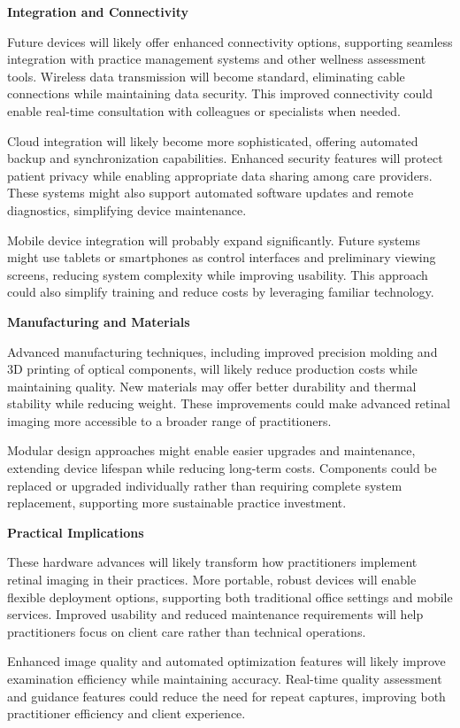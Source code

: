 \documentclass[
  Letterpaper,
]{scrbook}
\begin{document}
\textbf{Integration and Connectivity}

Future devices will likely offer enhanced connectivity options,
supporting seamless integration with practice management systems and
other wellness assessment tools. Wireless data transmission will become
standard, eliminating cable connections while maintaining data security.
This improved connectivity could enable real-time consultation with
colleagues or specialists when needed.

Cloud integration will likely become more sophisticated, offering
automated backup and synchronization capabilities. Enhanced security
features will protect patient privacy while enabling appropriate data
sharing among care providers. These systems might also support automated
software updates and remote diagnostics, simplifying device maintenance.

Mobile device integration will probably expand significantly. Future
systems might use tablets or smartphones as control interfaces and
preliminary viewing screens, reducing system complexity while improving
usability. This approach could also simplify training and reduce costs
by leveraging familiar technology.

\textbf{Manufacturing and Materials}

Advanced manufacturing techniques, including improved precision molding
and 3D printing of optical components, will likely reduce production
costs while maintaining quality. New materials may offer better
durability and thermal stability while reducing weight. These
improvements could make advanced retinal imaging more accessible to a
broader range of practitioners.

Modular design approaches might enable easier upgrades and maintenance,
extending device lifespan while reducing long-term costs. Components
could be replaced or upgraded individually rather than requiring
complete system replacement, supporting more sustainable practice
investment.

\textbf{Practical Implications}

These hardware advances will likely transform how practitioners
implement retinal imaging in their practices. More portable, robust
devices will enable flexible deployment options, supporting both
traditional office settings and mobile services. Improved usability and
reduced maintenance requirements will help practitioners focus on client
care rather than technical operations.

Enhanced image quality and automated optimization features will likely
improve examination efficiency while maintaining accuracy. Real-time
quality assessment and guidance features could reduce the need for
repeat captures, improving both practitioner efficiency and client
experience.
\end{document}
